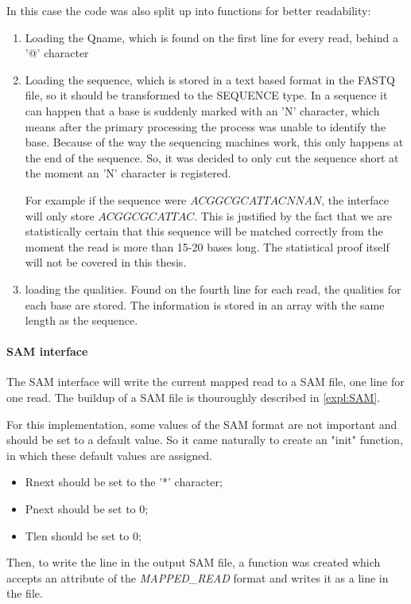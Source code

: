In this case the code was also split up into functions for better readability:
\begin{enumerate}
	\item Loading the Qname, which is found on the first line for every read, behind a '@' character
	\item Loading the sequence, which is stored in a text based format in the FASTQ file, so it should be transformed to the SEQUENCE type. In a sequence it can happen that a base is suddenly marked with an 'N' character, which means after the primary processing the process was unable to identify the base. Because of the way the sequencing machines work, this only happens at the end of the sequence. So, it was decided to only cut the sequence short at the moment an 'N' character is registered.
	
	For example if the sequence were $ACGGCGCATTACNNAN$, the interface will only store $ACGGCGCATTAC$. This is justified by the fact that we are statistically certain that this sequence will be matched correctly from the moment the read is more than 15-20 bases long. The statistical proof itself will not be covered in this thesis.
	\item loading the qualities. Found on the fourth line for each read, the qualities for each base are stored. The information is stored in an array with the same length as the sequence.
	
\end{enumerate}


\paragraph{SAM interface} The SAM interface will write the current mapped read to a SAM file, one line for one read. The buildup of a SAM file is thouroughly described in \ref{expl:SAM}.

For this implementation, some values of the SAM format are not important and should be set to a default value. So it came naturally to create an "init" function, in which these default values are assigned. 
\begin{itemize}
	\item Rnext should be set to the '*' character;
	\item Pnext should be set to 0;
	\item Tlen should be set to 0;
\end{itemize}

Then, to write the line in the output SAM file, a function was created which accepts an attribute of the \emph{MAPPED\_READ} format and writes it as a line in the file.

